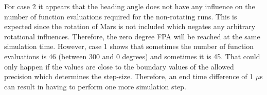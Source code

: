 \noindent
For case 2 it appears that the heading angle does not have any influence on the number of function evaluations required for the non-rotating runs. This is expected since the rotation of Mars is not included which negates any arbitrary rotational influences. Therefore, the zero degree \ac{FPA} will be reached at the same simulation time. However, case 1 shows that sometimes the number of function evaluations is 46 (between 300 and 0 degrees) and sometimes it is 45. That could only happen if the values are close to the boundary values of the allowed precision which determines the step-size. Therefore, an end time difference of 1 $\mu$s can result in having to perform one more simulation step. 



\begin{figure}[H]
\centering
{} 

\end{figure}
